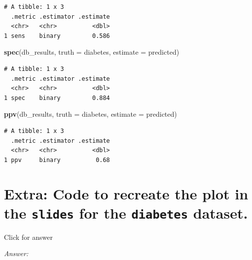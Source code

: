 \documentclass[
]{book}
\newenvironment{Shaded}{\begin{snugshade}}{\end{snugshade}}
\newcommand{\AttributeTok}[1]{\textcolor[rgb]{0.13,0.29,0.53}{#1}}
\newcommand{\FunctionTok}[1]{\textcolor[rgb]{0.13,0.29,0.53}{\textbf{#1}}}
\newcommand{\NormalTok}[1]{#1}
\begin{document}
\begin{verbatim}
# A tibble: 1 x 3
  .metric .estimator .estimate
  <chr>   <chr>          <dbl>
1 sens    binary         0.586
\end{verbatim}

\begin{Shaded}
\begin{Highlighting}[]
\FunctionTok{spec}\NormalTok{(db\_results, }\AttributeTok{truth =}\NormalTok{ diabetes,}
         \AttributeTok{estimate =}\NormalTok{ predicted)}
\end{Highlighting}
\end{Shaded}

\begin{verbatim}
# A tibble: 1 x 3
  .metric .estimator .estimate
  <chr>   <chr>          <dbl>
1 spec    binary         0.884
\end{verbatim}

\begin{Shaded}
\begin{Highlighting}[]
\FunctionTok{ppv}\NormalTok{(db\_results, }\AttributeTok{truth =}\NormalTok{ diabetes,}
         \AttributeTok{estimate =}\NormalTok{ predicted)}
\end{Highlighting}
\end{Shaded}

\begin{verbatim}
# A tibble: 1 x 3
  .metric .estimator .estimate
  <chr>   <chr>          <dbl>
1 ppv     binary          0.68
\end{verbatim}

\hypertarget{extra-code-to-recreate-the-plot-in-the-slides-for-the-diabetes-dataset.}{%
\section{\texorpdfstring{Extra: Code to recreate the plot in the \texttt{slides} for the \texttt{diabetes} dataset.}{Extra: Code to recreate the plot in the slides for the diabetes dataset.}}\label{extra-code-to-recreate-the-plot-in-the-slides-for-the-diabetes-dataset.}}

Click for answer

\emph{Answer:}
\end{document}
